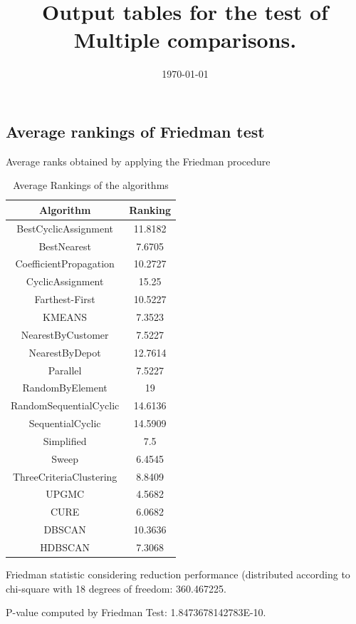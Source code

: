 \documentclass[a4paper,10pt]{article}
\title{Output tables for the test of Multiple comparisons.}
\author{}
\date{\today}
\begin{document}
\begin{landscape}
\pagestyle{empty}
\maketitle
\thispagestyle{empty}
\section{Average rankings of Friedman test}



Average ranks obtained by applying the Friedman procedure

\begin{table}[!htp]
\centering
\begin{tabular}{|c|c|}\hline
Algorithm&Ranking\\\hline
BestCyclicAssignment & 11.8182\\
BestNearest & 7.6705\\
CoefficientPropagation & 10.2727\\
CyclicAssignment & 15.25\\
Farthest-First & 10.5227\\
KMEANS & 7.3523\\
NearestByCustomer & 7.5227\\
NearestByDepot & 12.7614\\
Parallel & 7.5227\\
RandomByElement & 19\\
RandomSequentialCyclic & 14.6136\\
SequentialCyclic & 14.5909\\
Simplified & 7.5\\
Sweep & 6.4545\\
ThreeCriteriaClustering & 8.8409\\
UPGMC & 4.5682\\
CURE & 6.0682\\
DBSCAN & 10.3636\\
HDBSCAN & 7.3068\\
\hline
\end{tabular}
\caption{Average Rankings of the algorithms}
\end{table}

Friedman statistic considering reduction performance (distributed according to chi-square with 18 degrees of freedom: 360.467225.

P-value computed by Friedman Test: 1.8473678142783E-10.\newline


\end{landscape}
\end{document}
